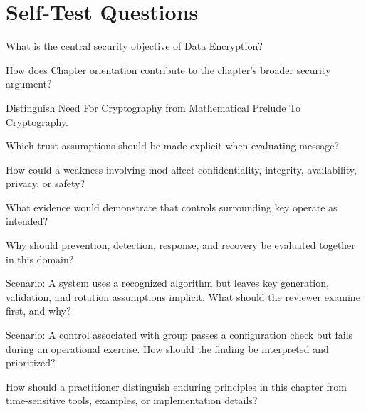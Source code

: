 \documentclass[11pt,letterpaper]{article}
\begin{document}
\section*{Self-Test Questions}
\begin{CornellRecallList}
\item What is the central security objective of Data Encryption?
\item How does Chapter orientation contribute to the chapter's broader security argument?
\item Distinguish Need For Cryptography from Mathematical Prelude To Cryptography.
\item Which trust assumptions should be made explicit when evaluating message?
\item How could a weakness involving mod affect confidentiality, integrity, availability, privacy, or safety?
\item What evidence would demonstrate that controls surrounding key operate as intended?
\item Why should prevention, detection, response, and recovery be evaluated together in this domain?
\item Scenario: A system uses a recognized algorithm but leaves key generation, validation, and rotation assumptions implicit. What should the reviewer examine first, and why?
\item Scenario: A control associated with group passes a configuration check but fails during an operational exercise. How should the finding be interpreted and prioritized?
\item How should a practitioner distinguish enduring principles in this chapter from time-sensitive tools, examples, or implementation details?
\end{CornellRecallList}
\end{document}
